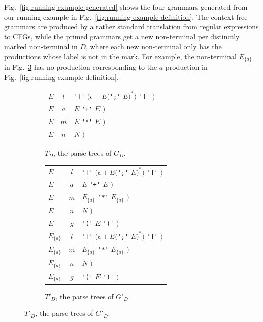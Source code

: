 \documentclass[acmsmall,review,anonymous]{acmart}\settopmatter{printfolios=true,printccs=false,printacmref=false}
\begin{document}
\noindent Fig.~\ref{fig:running-example-generated} shows the four grammars generated from our running example in Fig.~\ref{fig:running-example-definition}. The context-free grammars are produced by a rather standard translation from regular expressions to CFGs, while the primed grammars get a new non-terminal per distinctly marked non-terminal in $D$, where each new non-terminal only has the productions whose label is not in the mark. For example, the non-terminal $E_{\{a\}}$ in Fig.~\ref{fig:running-example-generated:t-prime} has no production corresponding to the $a$ production in Fig.~\ref{fig:running-example-definition}.

\begin{figure}
  \begin{subfigure}[t]{.45\linewidth}
    \centering
    \begin{tabular}{@{}l@{\quad$->$\quad}c@{$($ }l@{}}
      \toprule
      $E$ & $l$ & \verb|'['| $(\epsilon + E($\verb|';'| $E)^{*})$ \verb|']'| $)$ \\
      $E$ & $a$ & $E$ \verb|'+'| $E$ $)$ \\
      $E$ & $m$ & $E$ \verb|'*'| $E$ $)$ \\
      $E$ & $n$ & $N$ $)$ \\
      \bottomrule
    \end{tabular}
    \caption{$T_D$, the parse trees of $G_D$.}
    \label{fig:running-example-generated:t}
  \end{subfigure}%
%
  \begin{subfigure}[t]{.45\linewidth}
    \centering
    \begin{tabular}{@{}l@{\quad$->$\quad}c@{$($ }l@{}}
      \toprule
      $E$ & $l$ & \verb|'['| $(\epsilon + E($\verb|';'| $E)^{*})$ \verb|']'| $)$ \\
      $E$ & $a$ & $E$ \verb|'+'| $E$ $)$ \\
      $E$ & $m$ & $E_{\{a\}}$ \verb|'*'| $E_{\{a\}}$ $)$ \\
      $E$ & $n$ & $N$ $)$ \\
      $E$ & $g$ & \verb|'('| $E$ \verb|')'| $)$ \\
      \midrule
      $E_{\{a\}}$ & $l$ & \verb|'['| $(\epsilon + E($\verb|';'| $E)^{*})$ \verb|']'| $)$ \\
      $E_{\{a\}}$ & $m$ & $E_{\{a\}}$ \verb|'*'| $E_{\{a\}}$ $)$ \\
      $E_{\{a\}}$ & $n$ & $N$ $)$ \\
      $E_{\{a\}}$ & $g$ & \verb|'('| $E$ \verb|')'| $)$ \\
      \bottomrule
    \end{tabular}
    \caption{$T'_D$, the parse trees of $G'_D$.}
    \label{fig:running-example-generated:t-prime}
  \end{subfigure}


\end{figure}
\end{document}
